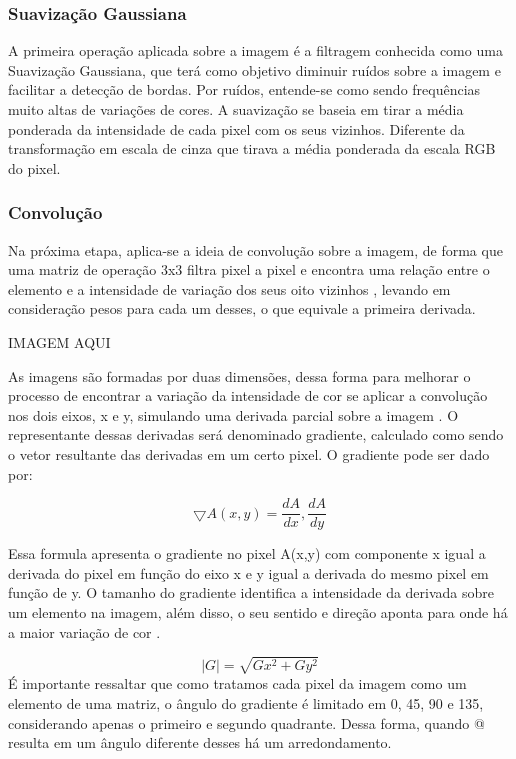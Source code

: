 \documentclass[12pt]{article}
\begin{document}
	\subsubsection{Suavização Gaussiana}
	A primeira operação aplicada sobre a imagem é a filtragem conhecida como uma Suavização Gaussiana, que terá como objetivo diminuir ruídos sobre a imagem e facilitar a detecção de bordas. Por ruídos, entende-se como sendo frequências muito altas de variações de cores. A suavização se baseia em tirar a média ponderada da intensidade de cada pixel com os seus vizinhos. Diferente da transformação em escala de cinza que tirava a média ponderada da escala RGB do pixel.  
	
	\subsubsection{Convolução}
	Na próxima etapa, aplica-se a ideia de convolução sobre a imagem, de forma que uma matriz de operação 3x3 filtra pixel a pixel e encontra uma relação entre o elemento e a intensidade de variação dos seus oito vizinhos \cite{do2002processo}, levando em consideração pesos para cada um desses, o que equivale a primeira derivada.
	
	IMAGEM AQUI
	
	As imagens são formadas por duas dimensões, dessa forma para melhorar o processo de encontrar a variação da intensidade de cor se aplicar a convolução nos dois eixos, x e y, simulando uma derivada parcial sobre a imagem \cite{biasi2002desenvolvimento}. O representante dessas derivadas será denominado gradiente, calculado como sendo o vetor resultante das derivadas em um certo pixel. O gradiente pode ser dado por:
	
	\begin{equation}
	\bigtriangledown A(x,y)=\frac{dA}{dx},\frac{dA}{dy}
	\end{equation}
	
	Essa formula apresenta o gradiente no pixel A(x,y) com componente x igual a derivada do pixel em função do eixo x e y igual a derivada do mesmo pixel em função de y. O tamanho do gradiente identifica a intensidade da derivada sobre um elemento na imagem, além disso, o seu sentido e direção aponta para onde há a maior variação de cor \cite{de2006introduccao}.
	
	\begin{equation}
	\mid G \mid= \sqrt{Gx^2+Gy^2}
	\end{equation}
	É importante ressaltar que como tratamos cada pixel da imagem como um elemento de uma matriz, o ângulo do gradiente é limitado em 0, 45, 90 e 135, considerando apenas o primeiro e segundo quadrante. Dessa forma, quando @ resulta em um ângulo diferente desses há um arredondamento.
	
\end{document}
